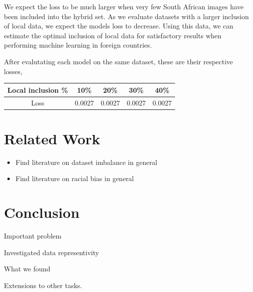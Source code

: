 \documentclass[conference]{IEEEtran}
\begin{document}
We expect the loss to be much larger when very few South African images have been included into the hybrid set. As we evaluate datasets with a larger inclusion of local data, we expect the models loss to decrease. Using this data, we can estimate the optimal inclusion of local data for satisfactory results when performing machine learning in foreign countries.

After evalutating each model on the same dataset, these are their respective losses,

\begin{table}[h]
\centering
\begin{tabular}{|c|c|c|c|c|}
\hline 
Local inclusion \% & 10\% & 20\% & 30\% & 40\% \\ 
\hline 
Loss & 0.0027 & 0.0027 & 0.0027 & 0.0027 \\ 
\hline 
\end{tabular} 
\end{table}

\section{Related Work}

\begin{itemize}
    \item Find literature on dataset imbalance in general
    \item Find literature on racial bias in general
\end{itemize}

\section{Conclusion}

Important problem

Investigated data representivity

What we found

Extensions to other tasks.

\medskip
 


\end{document}
